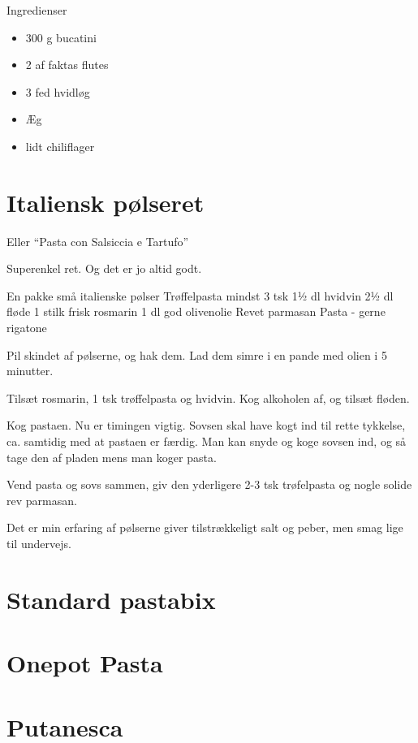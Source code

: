 \documentclass[
]{book}
\providecommand{\tightlist}{%
  \setlength{\itemsep}{0pt}\setlength{\parskip}{0pt}}
\begin{document}
Ingredienser

\begin{itemize}
\tightlist
\item
  300 g bucatini
\item
  2 af faktas flutes
\item
  3 fed hvidløg
\item
  Æg
\item
  lidt chiliflager
\end{itemize}

\hypertarget{italiensk-puxf8lseret}{%
\section{Italiensk pølseret}\label{italiensk-puxf8lseret}}

Eller ``Pasta con Salsiccia e Tartufo''

Superenkel ret. Og det er jo altid godt.

En pakke små italienske pølser
Trøffelpasta mindst 3 tsk
1½ dl hvidvin
2½ dl fløde
1 stilk frisk rosmarin
1 dl god olivenolie
Revet parmasan
Pasta - gerne rigatone

Pil skindet af pølserne, og hak dem. Lad dem simre i en pande med olien i 5 minutter.

Tilsæt rosmarin, 1 tsk trøffelpasta og hvidvin. Kog alkoholen af, og tilsæt fløden.

Kog pastaen. Nu er timingen vigtig. Sovsen skal have kogt ind til rette tykkelse, ca. samtidig med at pastaen er færdig. Man kan snyde og koge sovsen ind, og så tage den af pladen mens man koger pasta.

Vend pasta og sovs sammen, giv den yderligere 2-3 tsk trøfelpasta og nogle solide rev parmasan.

Det er min erfaring af pølserne giver tilstrækkeligt salt og peber, men smag lige til undervejs.

\hypertarget{standard-pastabix}{%
\section{Standard pastabix}\label{standard-pastabix}}

\hypertarget{onepot-pasta}{%
\section{Onepot Pasta}\label{onepot-pasta}}

\hypertarget{putanesca}{%
\section{Putanesca}\label{putanesca}}
\end{document}
